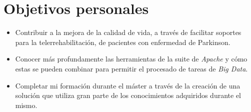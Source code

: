 \section{Objetivos personales}

\begin{itemize}
	\item Contribuir a la mejora de la calidad de vida, a través de facilitar soportes para la telerrehabilitación, de pacientes con enfermedad de Parkinson.
	\item Conocer más profundamente las herramientas de la suite de \textit{Apache} y cómo estas se pueden combinar para permitir el procesado de tareas de \textit{Big Data}.
	\item Completar mi formación durante el máster a través de la creación de una solución que utiliza gran parte de los conocimientos adquiridos durante el mismo.
\end{itemize}

